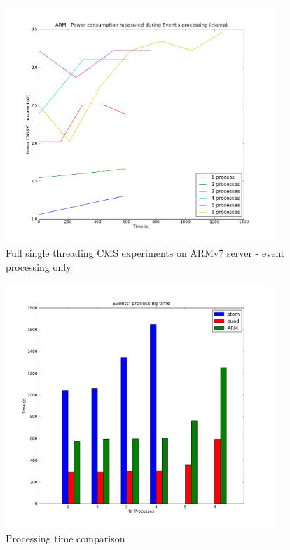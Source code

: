 \begin{figure}[h!]
  \centering
    \includegraphics[width=100mm]{"img/aalto/aalto_armEvents"}
    \caption{Full single threading CMS experiments on ARMv7 server - event
processing only}
    \label{fig:aalto_arm_events}
\end{figure}


\begin{figure}[h!]
  \centering
    \includegraphics[width=100mm]{"img/aalto/aalto_all_time"}
    \caption{Processing time comparison}
    \label{fig:aalto_time}
\end{figure}

